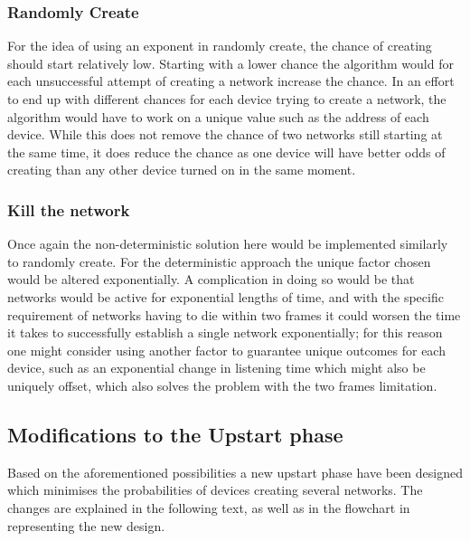 \subsubsection*{Randomly Create}
For the idea of using an exponent in randomly create, the chance of creating should start relatively low.
Starting with a lower chance the algorithm would for each unsuccessful attempt of creating a network increase the chance.
In an effort to end up with different chances for each device trying to create a network, the algorithm would have to work on a unique value such as the address of each device.
While this does not remove the chance of two networks still starting at the same time, it does reduce the chance as one device will have better odds of creating than any other device turned on in the same moment.
\subsubsection*{Kill the network}
Once again the non-deterministic solution here would be implemented similarly to randomly create.
For the deterministic approach the unique factor chosen would be altered exponentially.
A complication in doing so would be that networks would be active for exponential lengths of time, and with the specific requirement of networks having to die within two frames it could worsen the time it takes to successfully establish a single network exponentially; for this reason one might consider using another factor to guarantee unique outcomes for each device, such as an exponential change in listening time which might also be uniquely offset, which also solves the problem with the two frames limitation.

\subsection{Modifications to the Upstart phase}                 
Based on the aforementioned possibilities a new upstart phase have been designed which minimises the probabilities of devices creating several networks.
The changes are explained in the following text, as well as in the flowchart in  representing the new design.

